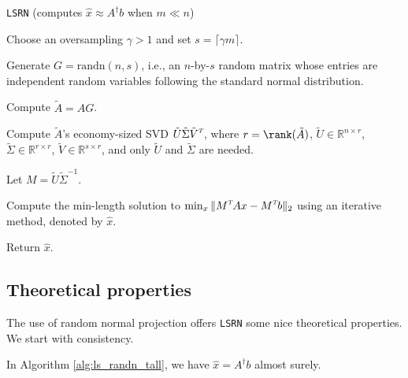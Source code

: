 \documentclass{siamltex}
\newcommand{\T}{^{\raisebox{0.09em}{\hbox{\tiny $T$}}\hspace{-0.1em}}}
\begin{document}
\begin{algorithm}
  \caption{\texttt{LSRN} (computes $\hat{x} \approx A^\dagger b$ when $m \ll n$)}
  \label{alg:ls_randn_fat}
  \begin{algorithmic}[1]
    \STATE Choose an oversampling $\gamma > 1$ and set $s = \lceil \gamma m
    \rceil$.

    \STATE Generate $G = \text{randn}(n,s)$, i.e., an $n$-by-$s$ random matrix
    whose entries are independent random variables following the standard normal
    distribution.

    \STATE Compute $\tilde{A} = A G$.

    \STATE Compute $\tilde{A}$'s economy-sized SVD $\tilde{U} \tilde{\Sigma}
    \tilde{V}\T$, where $r = \rank(\tilde{A})$, $\tilde{U} \in \mathbb{R}^{n
      \times r}$, $\tilde{\Sigma} \in \mathbb{R}^{r \times r}$, $\tilde{V} \in
    \mathbb{R}^{s \times r}$, and only $\tilde{U}$ and $\tilde{\Sigma}$ are
    needed.
    
    \STATE Let $M = \tilde{U} \tilde{\Sigma}^{-1}$.
  
    \STATE Compute the min-length solution to $\min_x \| M\T A x - M\T b \|_2$
    using an iterative method, denoted by $\hat{x}$.

    \STATE Return $\hat{x}$.
  \end{algorithmic}
\end{algorithm}

\subsection{Theoretical properties}
\label{subsec:theoretical_properties}

The use of random normal projection offers \texttt{LSRN} some nice theoretical
properties. We start with consistency.

\begin{theorem}
  \label{thm:consistency}
  In Algorithm \ref{alg:ls_randn_tall}, we have $\hat{x} = A^\dagger b$ almost
  surely.
\end{theorem}
\end{document}
